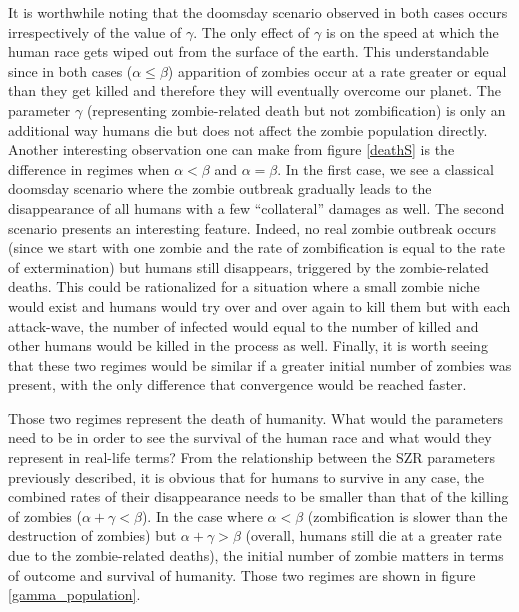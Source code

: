 \documentclass[11pt]{article} %
\begin{document}
It is worthwhile noting that the doomsday scenario observed in both cases occurs irrespectively of the value of $\gamma$. The only effect of $\gamma$ is on the speed at which the human race gets wiped out from the surface of the earth. This understandable since in both cases ($\alpha\leq\beta$) apparition of zombies occur at a rate greater or equal than they get killed and therefore they will eventually overcome our planet. The parameter $\gamma$ (representing zombie-related death but not zombification) is only an additional way humans die but does not affect the zombie population directly. Another interesting observation one can make from figure \ref{deathS} is the difference in regimes when $\alpha<\beta$ and $\alpha=\beta$. In the first case, we see a classical doomsday scenario where the zombie outbreak gradually leads to the disappearance of all humans with a few ``collateral'' damages as well. The second scenario presents an interesting feature. Indeed, no real zombie outbreak occurs (since we start with one zombie and the rate of zombification is equal to the rate of extermination) but humans still disappears, triggered by the zombie-related deaths. This could be rationalized for a situation where a small zombie niche would exist and humans would try over and over again to kill them but with each attack-wave, the number of infected would equal to the number of killed and other humans would be killed in the process as well. Finally, it is worth seeing that these two regimes would be similar if a greater initial number of zombies was present, with the only difference that convergence would be reached faster. 

Those two regimes represent the death of humanity. What would the parameters need to be in order to see the survival of the human race and what would they represent in real-life terms? From the relationship between the SZR parameters previously described, it is obvious that for humans to survive in any case, the combined rates of their disappearance needs to be smaller than that of the killing of zombies ($\alpha+\gamma<\beta$). In the case where $\alpha<\beta$ (zombification is slower than the destruction of zombies) but  $\alpha+\gamma>\beta$ (overall, humans still die at a greater rate due to the zombie-related deaths), the initial number of zombie matters in terms of outcome and survival of humanity. Those two regimes are shown in figure \ref{gamma_population}.
\end{document}
